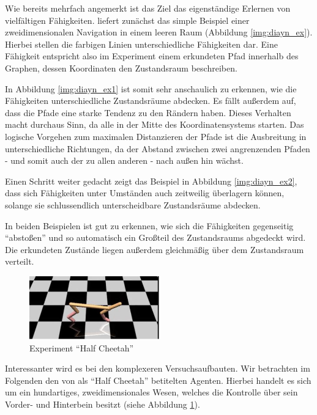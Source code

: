 Wie bereits mehrfach angemerkt ist das Ziel das eigenständige Erlernen von vielfältigen Fähigkeiten. \cite{diversity_eysenbach} liefert zunächst das simple Beispiel einer zweidimensionalen Navigation in einem leeren Raum (Abbildung \ref{img:diayn_ex}). Hierbei stellen die farbigen Linien unterschiedliche Fähigkeiten dar. Eine Fähigkeit entspricht also im Experiment einem erkundeten Pfad innerhalb des Graphen, dessen Koordinaten den Zustandsraum beschreiben.

In Abbildung \ref{img:diayn_ex1} ist somit sehr anschaulich zu erkennen, wie die Fähigkeiten unterschiedliche Zustandsräume abdecken. Es fällt außerdem auf, dass die Pfade eine starke Tendenz zu den Rändern haben. Dieses Verhalten macht durchaus Sinn, da alle in der Mitte des Koordinatensystems starten. Das logische Vorgehen zum maximalen Distanzieren der Pfade ist die Ausbreitung in unterschiedliche Richtungen, da der Abstand zwischen zwei angrenzenden Pfaden - und somit auch der zu allen anderen - nach außen hin wächst. 

Einen Schritt weiter gedacht zeigt das Beispiel in Abbildung \ref{img:diayn_ex2}, dass sich Fähigkeiten unter Umständen auch zeitweilig überlagern können, solange sie schlussendlich unterscheidbare Zustandsräume abdecken.

\smallspace

In beiden Beispielen ist gut zu erkennen, wie sich die Fähigkeiten gegenseitig ``abstoßen'' und so automatisch ein Großteil des Zustandsraums abgedeckt wird. Die erkundeten Zustände liegen außerdem gleichmäßig über dem Zustandsraum verteilt.

\smallspace

\begin{figure}[h]
\includegraphics[width=0.5\textwidth, keepaspectratio=true, center]{images/cheetah_image.JPG}
\caption{Experiment ``Half Cheetah''} \label{img:cheetah_ex}
\end{figure}

Interessanter wird es bei den komplexeren Versuchsaufbauten. Wir betrachten im Folgenden den von \cite{diversity_eysenbach} als ``Half Cheetah'' betitelten Agenten. Hierbei handelt es sich um ein hundartiges, zweidimensionales Wesen, welches die Kontrolle über sein Vorder- und Hinterbein besitzt (siehe Abbildung \ref{img:cheetah_ex}).

